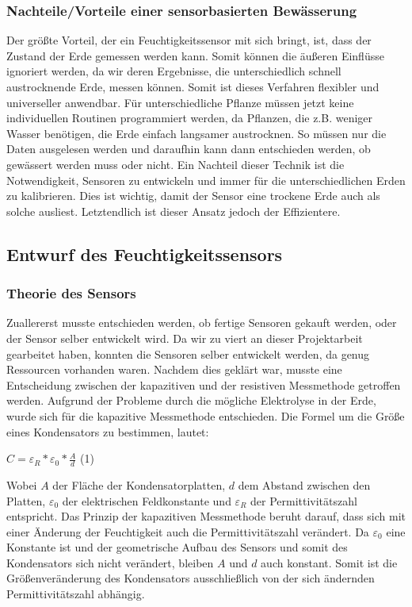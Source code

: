 \subsubsection{Nachteile/Vorteile einer sensorbasierten Bewässerung}
Der größte Vorteil, der ein Feuchtigkeitssensor mit sich bringt, ist, dass der Zustand der Erde
gemessen werden kann. Somit können die äußeren Einflüsse ignoriert werden, da wir deren
Ergebnisse, die unterschiedlich schnell austrocknende Erde, messen können. Somit ist dieses
Verfahren flexibler und universeller anwendbar. Für unterschiedliche Pflanze müssen jetzt
keine individuellen Routinen programmiert werden, da Pflanzen, die z.B. weniger Wasser
benötigen, die Erde einfach langsamer austrocknen. So müssen nur die Daten ausgelesen
werden und daraufhin kann dann entschieden werden, ob gewässert werden muss oder
nicht.
Ein Nachteil dieser Technik ist die Notwendigkeit, Sensoren zu entwickeln und immer für die
unterschiedlichen Erden zu kalibrieren. Dies ist wichtig, damit der Sensor eine trockene Erde
auch als solche ausliest. Letztendlich ist dieser Ansatz jedoch der Effizientere.

\subsection{Entwurf des Feuchtigkeitssensors}
\subsubsection{Theorie des Sensors} \label{sensortheorie}
Zuallererst musste entschieden werden, ob fertige Sensoren gekauft werden, oder der
Sensor selber entwickelt wird. Da wir zu viert an dieser Projektarbeit gearbeitet haben,
konnten die Sensoren selber entwickelt werden, da genug Ressourcen vorhanden waren.
Nachdem dies geklärt war, musste eine Entscheidung zwischen der kapazitiven und der
resistiven Messmethode getroffen werden. Aufgrund der Probleme durch die mögliche
Elektrolyse in der Erde, wurde sich für die kapazitive Messmethode entschieden.
Die Formel um die Größe eines Kondensators zu bestimmen, lautet:
\begin{center}
    $C = \varepsilon _R * \varepsilon _0 * \frac{A}{d}$ (1)
\end{center}
Wobei $A$ der Fläche der Kondensatorplatten, $d$ dem Abstand zwischen den Platten, $\varepsilon _0$ der
elektrischen Feldkonstante und $\varepsilon _R$ der Permittivitätszahl entspricht. Das Prinzip der
kapazitiven Messmethode beruht darauf, dass sich mit einer Änderung der Feuchtigkeit auch
die Permittivitätszahl verändert. Da $\varepsilon _0$ eine Konstante ist und der geometrische Aufbau des
Sensors und somit des Kondensators sich nicht verändert, bleiben $A$ und $d$ auch konstant.
Somit ist die Größenveränderung des Kondensators ausschließlich von der sich ändernden
Permittivitätszahl abhängig.

